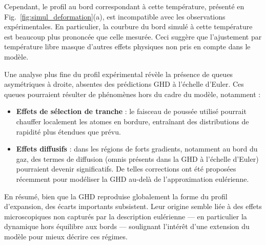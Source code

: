 Cependant, le profil au bord correspondant à cette température, présenté en Fig.~\ref{fig:simul_deformation}(a), est incompatible avec les observations expérimentales. En particulier, la courbure du bord simulé à cette température est beaucoup plus prononcée que celle mesurée. Ceci suggère que l’ajustement par température libre masque d'autres effets physiques non pris en compte dans le modèle.

\medskip

Une analyse plus fine du profil expérimental révèle la présence de queues asymétriques à droite, absentes des prédictions GHD à l’échelle d’Euler. Ces queues pourraient résulter de phénomènes hors du cadre du modèle, notamment :

\begin{itemize}
\item \textbf{Effets de sélection de tranche} : le faisceau de poussée utilisé pourrait chauffer localement les atomes en bordure, entraînant des distributions de rapidité plus étendues que prévu.
\item \textbf{Effets diffusifs} : dans les régions de forts gradients, notamment au bord du gaz, des termes de diffusion (omnis présents dans la GHD à l’échelle d’Euler) pourraient devenir significatifs. De telles corrections ont été proposées récemment pour modéliser la GHD au-delà de l’approximation eulérienne.
\end{itemize}

\medskip

En résumé, bien que la GHD reproduise globalement la forme du profil d’expansion, des écarts importants subsistent. Leur origine semble liée à des effets microscopiques non capturés par la description eulérienne — en particulier la dynamique hors équilibre aux bords — soulignant l’intérêt d’une extension du modèle pour mieux décrire ces régimes.


